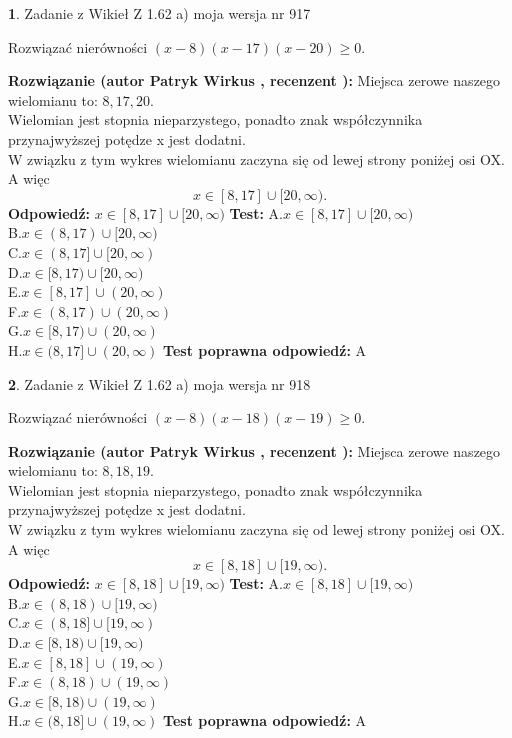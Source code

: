 \documentclass[12pt, a4paper]{article}
\theoremstyle{definition} %
\newtheorem{zad}{}
\newcommand{\zadStart}[1]{\begin{zad}#1\newline}
\newcommand{\zadStop}{\end{zad}}
\newcommand{\rozwStart}[2]{\noindent \textbf{Rozwiązanie (autor #1 , recenzent #2): }\newline}
\newcommand{\rozwStop}{\newline}
\newcommand{\odpStart}{\noindent \textbf{Odpowiedź:}\newline}
\newcommand{\odpStop}{\newline}
\newcommand{\testStart}{\noindent \textbf{Test:}\newline}
\newcommand{\testStop}{\newline}
\newcommand{\kluczStart}{\noindent \textbf{Test poprawna odpowiedź:}\newline}
\newcommand{\kluczStop}{\newline}
\begin{document}
\zadStart{Zadanie z Wikieł Z 1.62 a) moja wersja nr 917}

Rozwiązać nierówności $(x-8)(x-17)(x-20)\ge0$.
\zadStop
\rozwStart{Patryk Wirkus}{}
Miejsca zerowe naszego wielomianu to: $8, 17, 20$.\\
Wielomian jest stopnia nieparzystego, ponadto znak współczynnika przy\linebreak najwyższej potędze x jest dodatni.\\ W związku z tym wykres wielomianu zaczyna się od lewej strony poniżej osi OX. A więc $$x \in [8,17] \cup [20,\infty).$$
\rozwStop
\odpStart
$x \in [8,17] \cup [20,\infty)$
\odpStop
\testStart
A.$x \in [8,17] \cup [20,\infty)$\\
B.$x \in (8,17) \cup [20,\infty)$\\
C.$x \in (8,17] \cup [20,\infty)$\\
D.$x \in [8,17) \cup [20,\infty)$\\
E.$x \in [8,17] \cup (20,\infty)$\\
F.$x \in (8,17) \cup (20,\infty)$\\
G.$x \in [8,17) \cup (20,\infty)$\\
H.$x \in (8,17] \cup (20,\infty)$
\testStop
\kluczStart
A
\kluczStop



\zadStart{Zadanie z Wikieł Z 1.62 a) moja wersja nr 918}

Rozwiązać nierówności $(x-8)(x-18)(x-19)\ge0$.
\zadStop
\rozwStart{Patryk Wirkus}{}
Miejsca zerowe naszego wielomianu to: $8, 18, 19$.\\
Wielomian jest stopnia nieparzystego, ponadto znak współczynnika przy\linebreak najwyższej potędze x jest dodatni.\\ W związku z tym wykres wielomianu zaczyna się od lewej strony poniżej osi OX. A więc $$x \in [8,18] \cup [19,\infty).$$
\rozwStop
\odpStart
$x \in [8,18] \cup [19,\infty)$
\odpStop
\testStart
A.$x \in [8,18] \cup [19,\infty)$\\
B.$x \in (8,18) \cup [19,\infty)$\\
C.$x \in (8,18] \cup [19,\infty)$\\
D.$x \in [8,18) \cup [19,\infty)$\\
E.$x \in [8,18] \cup (19,\infty)$\\
F.$x \in (8,18) \cup (19,\infty)$\\
G.$x \in [8,18) \cup (19,\infty)$\\
H.$x \in (8,18] \cup (19,\infty)$
\testStop
\kluczStart
A
\kluczStop
\end{document}
